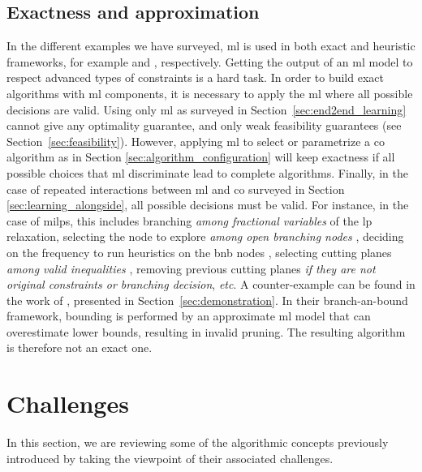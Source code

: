 \documentclass[11pt]{article}
\begin{document}
	\subsection{Exactness and approximation}
		In the different examples we have surveyed, \gls{ml} is used in both exact and heuristic
		frameworks, for example \cite{Baltean-LugojanStrongsparsecut2018} and
		\cite{LarsenPredictingSolutionSummaries2018}, respectively.
		Getting the output of an \gls{ml} model to respect advanced types of constraints is a hard task.
		In order to build exact algorithms with \gls{ml} components, it is necessary to apply the \gls{ml}
		where all possible decisions are valid.
		Using only \gls{ml} as surveyed in Section~\ref{sec:end2end_learning} cannot give any optimality
		guarantee, and only weak feasibility guarantees (see Section~\ref{sec:feasibility}).
		However, applying \gls{ml} to select or parametrize a \gls{co} algorithm as in Section
		\ref{sec:algorithm_configuration} will keep exactness if all possible choices that \gls{ml}
		discriminate lead to complete algorithms.
		Finally, in the case of repeated interactions between \gls{ml} and \gls{co} surveyed in Section
		\ref{sec:learning_alongside}, all possible decisions must be valid.
		For instance, in the case of \glspl{milp}, this includes branching \emph{among fractional
		variables} of the \gls{lp} relaxation, selecting the node to explore \emph{among open branching
		nodes} \citep{HeLearningSearchBranch2014}, deciding on the frequency to run heuristics on the
		\gls{bnb} nodes \citep{KhalilLearningRunHeuristics2017}, selecting cutting planes \emph{among valid
		inequalities} \citep{Baltean-LugojanStrongsparsecut2018}, removing previous cutting planes
		\emph{if they are not original constraints or branching decision}, \textit{etc}.
		A counter-example can be found in the work of \cite{HottungDeep2017}, presented in
		Section~\ref{sec:demonstration}.
		In their branch-an-bound framework, bounding is performed by an approximate \gls{ml} model that can
		overestimate lower bounds, resulting in invalid pruning.
		The resulting algorithm is therefore not an exact one.

\section{Challenges}
	\label{sec:challenges}
	In this section, we are reviewing some of the algorithmic concepts previously introduced by taking
	the viewpoint of their associated challenges.
\end{document}
